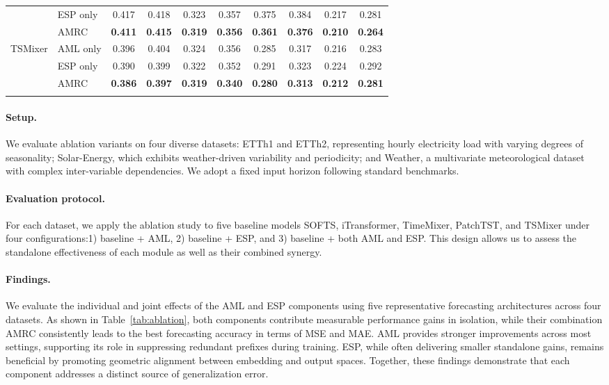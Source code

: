 \documentclass{article}
\begin{document}
\begin{table}[t]
{\begin{tabular}{llcccccccc}
\multicolumn{1}{l|}{} & ESP only & 0.417 & 0.418 & 0.323 & 0.357 & 0.375 & 0.384 & 0.217 & 0.281 \\
\multicolumn{1}{l|}{} & AMRC & \textbf{0.411} & \textbf{0.415} & \textbf{0.319} & \textbf{0.356} & \textbf{0.361} & \textbf{0.376} & \textbf{0.210} & \textbf{0.264} \\
\midrule
\multicolumn{1}{l|}{\multirow{3}{*}{TSMixer}} 
& AML only & 0.396 & 0.404 & 0.324 & 0.356 & 0.285 & 0.317 & 0.216 & 0.283 \\
\multicolumn{1}{l|}{} & ESP only & 0.390 & 0.399 & 0.322 & 0.352 & 0.291 & 0.323 & 0.224 & 0.292 \\
\multicolumn{1}{l|}{} & AMRC & \textbf{0.386} & \textbf{0.397} & \textbf{0.319} & \textbf{0.340} & \textbf{0.280} & \textbf{0.313} & \textbf{0.212} & \textbf{0.281} \\
\bottomrule
\vspace{-3em}
\end{tabular}
}
\end{table}

\paragraph{Setup.} 
We evaluate ablation variants on four diverse datasets: ETTh1 and ETTh2, representing hourly electricity load with varying degrees of seasonality; Solar-Energy, which exhibits weather-driven variability and periodicity; and Weather, a multivariate meteorological dataset with complex inter-variable dependencies. We adopt a fixed input horizon following standard benchmarks.

\paragraph{Evaluation protocol.} 
For each dataset, we apply the ablation study to five baseline models SOFTS, iTransformer, TimeMixer, PatchTST, and TSMixer under four configurations:1) baseline + AML, 2) baseline + ESP, and 3) baseline + both AML and ESP. This design allows us to assess the standalone effectiveness of each module as well as their combined synergy.

\paragraph{Findings.}
We evaluate the individual and joint effects of the AML and ESP components using five representative forecasting architectures across four datasets. As shown in Table~\ref{tab:ablation}, both components contribute measurable performance gains in isolation, while their combination AMRC consistently leads to the best forecasting accuracy in terms of MSE and MAE. AML provides stronger improvements across most settings, supporting its role in suppressing redundant prefixes during training. ESP, while often delivering smaller standalone gains, remains beneficial by promoting geometric alignment between embedding and output spaces. Together, these findings demonstrate that each component addresses a distinct source of generalization error.
\end{document}
